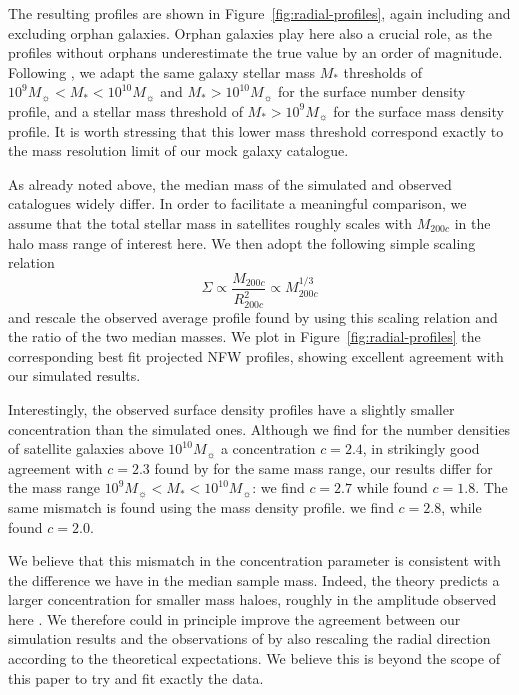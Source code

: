 \documentclass[a4paper,twocolumn,fleqn,usenatbib]{mnras}
\newcommand{\msol}{M_{\sun}}
\begin{document}
The resulting profiles  are shown in Figure~\ref{fig:radial-profiles},
again including  and excluding  orphan galaxies. Orphan  galaxies play
here  also   a  crucial   role,  as   the  profiles   without  orphans
underestimate  the true  value by  an order  of magnitude.   Following
\citet{vanderburgEvidenceInsideoutGrowth2015},   we  adapt   the  same
galaxy  stellar   mass  $M_*$  thresholds   of  $10^9\msol  <   M_*  <
10^{10}\msol$ and $M_* > 10^{10}\msol$  for the surface number density
profile, and  a stellar mass threshold  of $M_* > 10^9  \msol$ for the
surface mass  density profile. It  is worth stressing that  this lower
mass threshold correspond exactly to  the mass resolution limit of our
mock galaxy catalogue.

As already noted above, the median  mass of the simulated and observed
catalogues  widely  differ.  In   order  to  facilitate  a  meaningful
comparison,  we  assume that  the  total  stellar mass  in  satellites
roughly  scales with  $M_{200c}$ in  the halo  mass range  of interest
here. We then adopt the following simple scaling relation
\begin{equation}
\Sigma \propto \frac{M_{200c}}{R_{200c}^2} \propto M_{200c}^{1/3}
\end{equation}
and    rescale    the    observed    average    profile    found    by
\citet{vanderburgEvidenceInsideoutGrowth2015}   using   this   scaling
relation  and  the  ratio  of  the  two  median  masses.  We  plot  in
Figure~\ref{fig:radial-profiles} the corresponding best fit projected NFW
profiles, showing excellent agreement with our simulated results.

Interestingly, the  observed surface density profiles  have a slightly
smaller concentration than  the simulated ones.  Although  we find for
the  number densities  of  satellite galaxies  above $10^{10}\msol$  a
concentration $c  = 2.4$,  in strikingly  good agreement  with $c=2.3$
found  by \citet{vanderburgEvidenceInsideoutGrowth2015}  for the  same
mass range, our results differ for the  mass range $10^9 \msol < M_* <
10^{10}        \msol$:       we        find       $c=2.7$        while
\citet{vanderburgEvidenceInsideoutGrowth2015} found  $c=1.8$. The same
mismatch is  found using the  mass density profile.  we  find $c=2.8$,
while \citet{vanderburgEvidenceInsideoutGrowth2015} found $c=2.0$.

We  believe  that this  mismatch  in  the concentration  parameter  is
consistent  with  the   difference  we  have  in   the  median  sample
mass. Indeed, the  theory predicts a larger  concentration for smaller
mass haloes, roughly in the amplitude observed here \citep{zhaoAccurateUniversalModels2009}. 
We therefore  could in principle improve the agreement
between   our    simulation   results   and   the    observations   of
\citet{vanderburgEvidenceInsideoutGrowth2015}  by  also rescaling  the
radial direction according to the theoretical expectations. We believe
this is  beyond the  scope of this  paper to try  and fit  exactly the
data.
\end{document}
